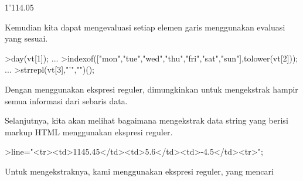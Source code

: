 \documentclass[a4paper,10pt]{article}
\begin{document}
\begin{eulernotebook}
\begin{eulercomment}
\begin{eulercomment}
\begin{eulercomment}
\begin{eulercomment}
\begin{eulercomment}
\begin{eulercomment}
\begin{eulercomment}
\begin{eulercomment}
\begin{eulercomment}
\begin{eulercomment}
\begin{eulercomment}
\begin{eulercomment}
\begin{eulercomment}
\begin{eulercomment}
\begin{euleroutput}
  1'114.05
\end{euleroutput}
\begin{eulercomment}
Kemudian kita dapat mengevaluasi setiap elemen garis menggunakan
evaluasi yang sesuai.
\end{eulercomment}
\begin{eulerprompt}
>day(vt[1]);  ...
>indexof(["mon","tue","wed","thu","fri","sat","sun"],tolower(vt[2]));  ...
>strrepl(vt[3],"'","")();
\end{eulerprompt}
\begin{eulercomment}
Dengan menggunakan ekspresi reguler, dimungkinkan untuk mengekstrak
hampir semua informasi dari sebaris data.

Selanjutnya, kita akan melihat bagaimana mengekstrak data string yang
berisi markup HTML menggunakan ekspresi reguler.
\end{eulercomment}
\begin{eulerprompt}
>line="<tr><td>1145.45</td><td>5.6</td><td>-4.5</td><tr>";
\end{eulerprompt}
\begin{eulercomment}
Untuk mengekstraknya, kami menggunakan ekspresi reguler, yang mencari


\end{eulercomment}
\end{eulercomment}
\end{eulercomment}
\end{eulercomment}
\end{eulercomment}
\end{eulercomment}
\end{eulercomment}
\end{eulercomment}
\end{eulercomment}
\end{eulercomment}
\end{eulercomment}
\end{eulercomment}
\end{eulercomment}
\end{eulercomment}
\end{eulercomment}
\end{eulernotebook}
\end{document}
